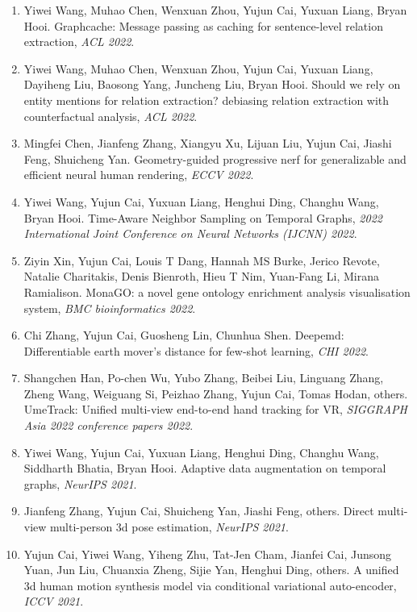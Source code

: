 \begin{enumerate}
\item Yiwei Wang, Muhao Chen, Wenxuan Zhou, Yujun Cai, Yuxuan Liang, Bryan Hooi. Graphcache: Message passing as caching for sentence-level relation extraction, \textit{ACL 2022}.

\item Yiwei Wang, Muhao Chen, Wenxuan Zhou, Yujun Cai, Yuxuan Liang, Dayiheng Liu, Baosong Yang, Juncheng Liu, Bryan Hooi. Should we rely on entity mentions for relation extraction? debiasing relation extraction with counterfactual analysis, \textit{ACL 2022}.

\item Mingfei Chen, Jianfeng Zhang, Xiangyu Xu, Lijuan Liu, Yujun Cai, Jiashi Feng, Shuicheng Yan. Geometry-guided progressive nerf for generalizable and efficient neural human rendering, \textit{ECCV 2022}.

\item Yiwei Wang, Yujun Cai, Yuxuan Liang, Henghui Ding, Changhu Wang, Bryan Hooi. Time-Aware Neighbor Sampling on Temporal Graphs, \textit{2022 International Joint Conference on Neural Networks (IJCNN) 2022}.

\item Ziyin Xin, Yujun Cai, Louis T Dang, Hannah MS Burke, Jerico Revote, Natalie Charitakis, Denis Bienroth, Hieu T Nim, Yuan-Fang Li, Mirana Ramialison. MonaGO: a novel gene ontology enrichment analysis visualisation system, \textit{BMC bioinformatics 2022}.

\item Chi Zhang, Yujun Cai, Guosheng Lin, Chunhua Shen. Deepemd: Differentiable earth mover's distance for few-shot learning, \textit{CHI 2022}.

\item Shangchen Han, Po-chen Wu, Yubo Zhang, Beibei Liu, Linguang Zhang, Zheng Wang, Weiguang Si, Peizhao Zhang, Yujun Cai, Tomas Hodan, others. UmeTrack: Unified multi-view end-to-end hand tracking for VR, \textit{SIGGRAPH Asia 2022 conference papers 2022}.

\item Yiwei Wang, Yujun Cai, Yuxuan Liang, Henghui Ding, Changhu Wang, Siddharth Bhatia, Bryan Hooi. Adaptive data augmentation on temporal graphs, \textit{NeurIPS 2021}.

\item Jianfeng Zhang, Yujun Cai, Shuicheng Yan, Jiashi Feng, others. Direct multi-view multi-person 3d pose estimation, \textit{NeurIPS 2021}.

\item Yujun Cai, Yiwei Wang, Yiheng Zhu, Tat-Jen Cham, Jianfei Cai, Junsong Yuan, Jun Liu, Chuanxia Zheng, Sijie Yan, Henghui Ding, others. A unified 3d human motion synthesis model via conditional variational auto-encoder, \textit{ICCV 2021}.


\end{enumerate}
